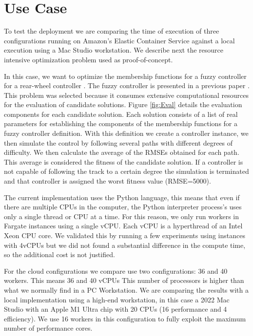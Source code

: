 \documentclass{cys}
\begin{document}
\section{Use Case}
\label{sec:use_case}

To test the deployment we are comparing the time of execution of 
three configurations running on Amazon's Elastic Container Service against 
a local execution using a Mac Studio workstation. %
We describe next the resource intensive 
optimization problem used as proof-of-concept.

In this case, we want to optimize the membership functions 
for a fuzzy controller for a rear-wheel controller \cite{paden_survey_2016}. 
The fuzzy controller is presented in a previous paper \cite{mancilla2022optimal}.
This problem was selected because it consumes extensive computational resources for
the evaluation of candidate solutions. Figure \ref{fig:Eval} details the evaluation
components for each candidate solution. Each solution consists of a list of real parameters 
for establishing the components of the membership functions for a fuzzy controller definition. 
With this definition we create a controller instance, we then simulate the control
by following several paths with different degrees of difficulty. We then calculate the
average of the RMSEs obtained for each path. This average is considered the fitness of 
the candidate solution. If a controller is not capable of following the track to a certain degree
the simulation is terminated and that controller is assigned the worst fitness value (RMSE=5000).

The current implementation uses the Python language, this means that even if there are 
multiple CPUs in the computer, the Python interpreter process's uses only a 
single thread or CPU at a time. For this reason, we only run workers in 
Fargate instances using a single vCPU. Each vCPU is a hyperthread of an 
Intel Xeon CPU core. We validated this by running a few experiments using 
instances with 4vCPUs but we did not found a substantial difference in the 
compute time, so the additional cost is not justified.

For the cloud configurations we compare use two configurations: 36 and 40 workers. 
This means 36 and 40 vCPUs This number of processors is higher than what we normally
find in a PC Workstation. We are comparing the results with a local implementation 
using a high-end workstation, in this case a 2022 Mac Studio with 
an Apple M1 Ultra chip with 20 CPUs (16 performance and 4 efficiency). We use 16 
workers in this configuration to fully exploit the maximum number of performance cores.
\end{document}
